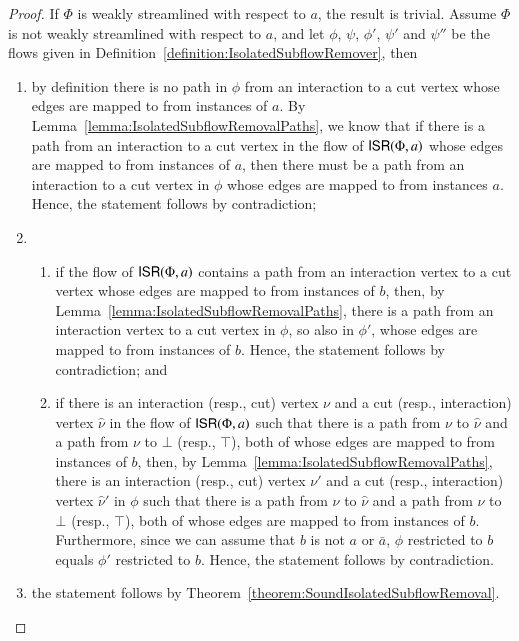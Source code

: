 
\begin{proof}
If $\Phi$ is weakly streamlined with respect to $a$, the result is trivial. Assume $\Phi$ is not weakly streamlined with respect to $a$, and let $\phi$, $\psi$, $\phi'$, $\psi'$ and $\psi''$ be the flows given in Definition~\vref{definition:IsolatedSubflowRemover}, then
\begin{enumerate}
\item by definition there is no path in $\phi$ from an interaction to a cut vertex whose edges are mapped to from instances of $a$. By Lemma~\vref{lemma:IsolatedSubflowRemovalPaths}, we know that if there is a path from an interaction to a cut vertex in the flow of $\mathsf{ISR}(\Phi,a)$ whose edges are mapped to from instances of $a$, then there must be a path from an interaction to a cut vertex in $\phi$ whose edges are mapped to from instances $a$. Hence, the statement follows by contradiction;
\item
\begin{enumerate}
 \item if the flow of $\mathsf{ISR}(\Phi,a)$ contains a path from an interaction vertex to a cut vertex whose edges are mapped to from instances of $b$, then, by Lemma~\vref{lemma:IsolatedSubflowRemovalPaths}, there is a path from an interaction vertex to a cut vertex in $\phi$, so also in $\phi'$, whose edges are mapped to from instances of $b$. Hence, the statement follows by contradiction; and
 \item if there is an interaction (resp., cut) vertex $\nu$ and a cut (resp., interaction) vertex $\hat\nu$ in the flow of $\mathsf{ISR}(\Phi,a)$ such that there is a path from $\nu$ to $\hat\nu$ and a path from $\nu$ to $\bot$ (resp., $\top$), both of whose edges are mapped to from instances of $b$, then, by Lemma~\vref{lemma:IsolatedSubflowRemovalPaths}, there is an interaction (resp., cut) vertex $\nu'$ and a cut (resp., interaction) vertex $\hat\nu'$ in $\phi$ such that there is a path from $\nu$ to $\hat\nu$ and a path from $\nu$ to $\bot$ (resp., $\top$), both of whose edges are mapped to from instances of $b$. Furthermore, since we can assume that $b$ is not $a$ or $\bar a$, $\phi$ restricted to $b$ equals $\phi'$ restricted to $b$. Hence, the statement follows by contradiction.
\end{enumerate}
\item the statement follows by Theorem~\vref{theorem:SoundIsolatedSubflowRemoval}.
\end{enumerate}
\end{proof}

